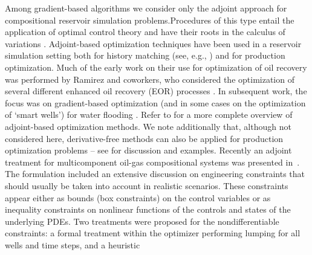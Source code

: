 Among gradient-based algorithms we consider only the adjoint approach for compositional reservoir
simulation problems.Procedures of this type entail the application of optimal
control theory and have their roots in the calculus of variations
\citep{Bryson:1975,Stengel:1986}. Adjoint-based optimization techniques have 
been used in a reservoir simulation setting both for history matching (see, e.g.,
\citep{Gavalas,Chavent,Li,Oliver,Pallav:2006}) and for production 
optimization. Much of the early work on their use for optimization of oil recovery was 
performed by Ramirez and coworkers, who considered the optimization of several different
enhanced oil recovery (EOR) processes \citep{Ramirez:book,Ramirez:1989,Ramirez:1993}. In subsequent work, the focus 
was on gradient-based optimization (and in some cases on the optimization of `smart
 wells') for water flooding \citep{Asheim,Virnovski,Sudaryanto:2000,Brouwer:2004,Pallav:2006}. 
Refer to \citep{Jansen:2011} for a more complete overview of adjoint-based 
optimization methods. We note additionally that, although not considered here, 
derivative-free methods can also be applied for production optimization problems -- see
\citep{echeverria:2011} for discussion and examples.
Recently an adjoint treatment for multicomponent oil-gas
compositional systems was presented in~\citep{Kourounis2014}. 
The formulation included an extensive discussion on engineering
constraints that should usually be taken into account in realistic scenarios. 
These constraints appear either as bounds (box constraints) 
on the control variables or as inequality constraints on 
nonlinear functions of the controls and states of the underlying PDEs.
 Two treatments were proposed for the nondifferentiable constraints: a formal 
treatment within the optimizer performing lumping for all wells and time steps, and a heuristic 
